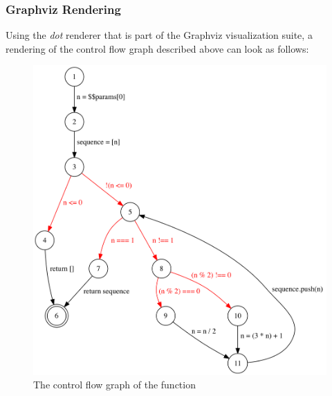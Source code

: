 \subsubsection{Graphviz Rendering}

Using the \emph{dot} renderer that is part of the Graphviz \cite{graphviz} visualization suite, a rendering of the control flow graph described above can look as follows:

\vspace{0.35cm}

\begin{figure}[h]
  \includegraphics[width=\textwidth]{sections/appendix/images/collatz}
  \caption{The control flow graph of the  function}
\end{figure}
